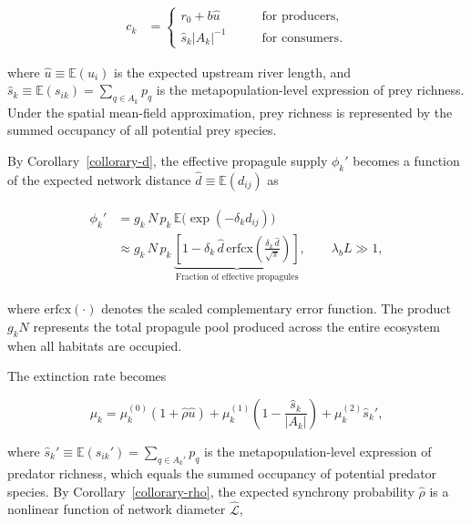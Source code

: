 \documentclass[11pt, class=article, crop=false]{standalone}
\theoremstyle{definition}
\begin{document}
\begin{align}
    c_k 
    &=
    \begin{cases}
        r_0 + b \hat{u} \qquad &\text{for producers},\\
        \hat{s}_k |A_k|^{-1} \qquad &\text{for consumers}.
    \end{cases}
    \label{eq:estb-prob}
\end{align}

where $\hat{u} \equiv \mathbb{E}(u_i)$ is the expected upstream river length, and
$\hat{s}_k \equiv \mathbb{E}(s_{ik}) = \sum_{q \in A_k} p_q$ is the metapopulation-level expression of prey richness.
Under the spatial mean-field approximation, prey richness is represented by the summed occupancy of all potential prey species.

By Corollary~\ref{collorary-d}, the effective propagule supply $\phi_k'$ becomes a function of the expected network distance $\hat{d} \equiv \mathbb{E}(d_{ij})$ as

\begin{align}
    \begin{split}
        \phi_k'
        &=
        g_k\,N\,p_k\,\mathbb{E}\bigl(\exp(-\delta_k d_{ij})\bigr)\\
        &\approx
        g_k\,N\,p_k\,
        \underbrace{
        \left[
            1 - \delta_k\,\hat{d}\,\mathrm{erfcx}
            \left(
                \frac{\delta_k\,\hat{d}}{\sqrt{\pi}}
            \right) 
        \right]
        }_{\text{Fraction of effective propagules}},
        \qquad
        \lambda_b L \gg 1,
    \end{split}
\end{align}

where $\mathrm{erfcx}(\cdot)$ denotes the scaled complementary error function.
The product $g_k N$ represents the total propagule pool produced across the entire ecosystem when all habitats are occupied.

The extinction rate becomes

\begin{equation}
    \mu_{k} = 
        \mu_{k}^{(0)} (1 + \hat{\rho} \hat{u}) + 
        \mu_{k}^{(1)} \left(1 - \frac{\hat{s}_k}{|A_k|} \right) + 
        \mu_{k}^{(2)} \hat{s}_k',
    \label{eq:mean-extn}    
\end{equation}

where $\hat{s}_k' \equiv \mathbb{E}(s_{ik}') = \sum_{q \in A_k'} p_q$ is the metapopulation-level expression of predator richness, which equals the summed occupancy of potential predator species.
By Corollary~\ref{collorary-rho}, the expected synchrony probability $\hat{\rho}$ is a nonlinear function of network diameter $\hat{\mathcal{L}}$,
\end{document}
